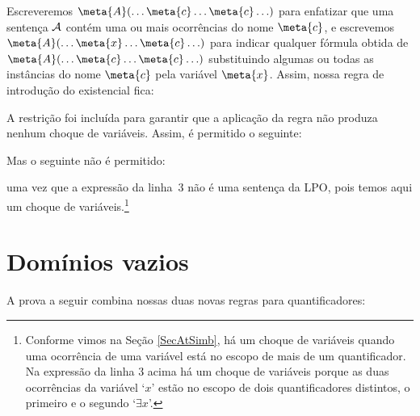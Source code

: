 Escreveremos $\meta{A}(\ldots \meta{c} \ldots \meta{c}\ldots)$ para enfatizar que uma sentença $\mathcal{A}$ contém uma ou mais ocorrências do nome $\meta{c}$, e escrevemos $\meta{A}(\ldots \meta{x} \ldots \meta{c}\ldots)$ para indicar qualquer fórmula obtida de $\meta{A}(\ldots \meta{c} \ldots \meta{c}\ldots)$ substituindo algumas ou todas as instâncias do nome  $\meta{c}$ pela variável $\meta{x}$. Assim, nossa regra de introdução do existencial fica:
 
\label{RegraEI}
A restrição foi incluída para garantir que a aplicação da regra não produza nenhum choque de variáveis. Assim, é permitido o seguinte:

\begin{fitchproof}
	 
	 
\end{fitchproof}
Mas o seguinte  não é permitido:
\begin{fitchproof}
	 
\end{fitchproof}
uma vez que a expressão da linha~3 não é uma sentença da LPO, pois 
temos aqui um choque de variáveis.\footnote{Conforme vimos na Seção \ref{SecAtSimb}, há um choque de variáveis quando uma ocorrência de uma variável está no escopo de mais de um quantificador. Na expressão da linha 3 acima há um choque de variáveis porque as duas ocorrências da variável `$x$' estão no escopo de dois quantificadores distintos, o primeiro e o segundo `$\exists x$'.}

\section{Domínios vazios}
A prova a seguir combina nossas duas novas regras para quantificadores:
	\begin{fitchproof}
	\end{fitchproof}

